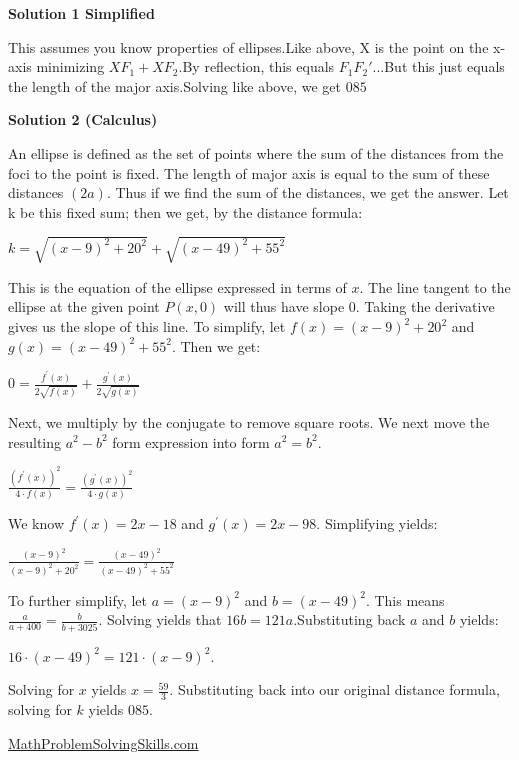 \begin{enumerate}
 



\textbf{Solution 1 Simplified}

This assumes you know properties of ellipses.Like above, X is the point on the x-axis minimizing $XF_1+XF_2$.By reflection, this equals $F_1F_2'$...But this just equals the length of the major axis.Solving like above, we get $\boxed{085}$




\textbf{Solution 2 (Calculus)}

An ellipse is defined as the set of points where the sum of the distances from the foci to the point is fixed. The length of major axis is equal to the sum of these distances $(2a)$. Thus if we find the sum of the distances, we get the answer. Let k be this fixed sum; then we get, by the distance formula:

 $k = \sqrt{(x - 9)^2 + 20^2} + \sqrt{(x - 49)^2 + 55^2}$

 This is the equation of the ellipse expressed in terms of $x$. The line tangent to the ellipse at the given point $P(x, 0)$ will thus have slope $0$. Taking the derivative gives us the slope of this line. To simplify, let $f(x) = (x - 9)^2 + 20^2$ and $g(x) = (x - 49)^2 + 55^2$. Then we get:

 $0 = \frac{f^\prime(x)}{2\sqrt{f(x)}} + \frac{g^\prime(x)}{2\sqrt{g(x)}}$

 Next, we multiply by the conjugate to remove square roots. We next move the resulting $a^2 - b^2$ form expression into form $a^2 = b^2$.

 $\frac{(f^\prime(x))^2}{4\cdot f(x)} = \frac{(g^\prime(x))^2}{4\cdot g(x)}$ 

 We know $f^\prime(x) = 2x - 18$ and $g^\prime(x) = 2x - 98$. Simplifying yields:

 $\frac{(x - 9)^2}{(x - 9)^2 + 20^2} = \frac{(x - 49)^2}{(x - 49)^2 + 55^2}$

 To further simplify, let $a = (x - 9)^2$ and $b = (x - 49)^2$. This means $\frac{a}{a + 400} = \frac{b}{b + 3025}$. Solving yields that $16b = 121a$.Substituting back $a$ and $b$ yields:

 $16 \cdot (x - 49)^2 = 121 \cdot (x - 9)^2$.

 Solving for $x$ yields $x = \frac{59}{3}$. Substituting back into our original distance formula, solving for $k$ yields $\boxed{085}$.

 \href{https://mathproblemsolvingskills.wordpress.com/}{MathProblemSolvingSkills.com}


\end{enumerate}
